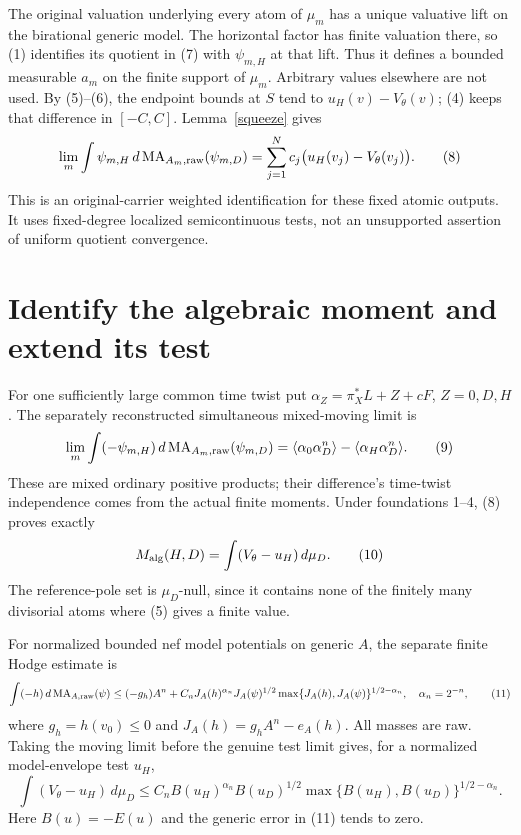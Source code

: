 \documentclass[10pt]{article}
\newcommand{\MA}{\operatorname{MA}}
\begin{document}
The original valuation underlying every atom of $\mu_m$ has a unique
valuative lift on the birational generic model. The horizontal factor
has finite valuation there, so (1) identifies its quotient in (7) with
$\psi_{m,H}$ at that lift. Thus it defines a bounded measurable $a_m$
on the finite support of $\mu_m$. Arbitrary values elsewhere are not
used. By (5)--(6), the endpoint bounds at $S$ tend to
$u_H(v)-V_\theta(v)$; (4) keeps that difference in $[-C,C]$.
Lemma~\ref{squeeze} gives
\[
 \lim_m\int\psi_{m,H}\,d\MA_{A_m,\rm raw}(\psi_{m,D})
       =\sum_{j=1}^N c_j\bigl(u_H(v_j)-V_\theta(v_j)\bigr).
 \tag{8}
\]
This is an original-carrier weighted identification for these fixed
atomic outputs. It uses fixed-degree localized semicontinuous tests,
not an unsupported assertion of uniform quotient convergence.

\section{Identify the algebraic moment and extend its test}
For one sufficiently large common time twist put
$\alpha_Z=\pi_X^*L+Z+cF$, $Z=0,D,H$. The separately reconstructed
simultaneous mixed-moving limit is
\[
 \lim_m\int(-\psi_{m,H})\,d\MA_{A_m,\rm raw}(\psi_{m,D})
  =\langle\alpha_0\alpha_D^n\rangle
                        -\langle\alpha_H\alpha_D^n\rangle.
 \tag{9}
\]
These are mixed ordinary positive products; their difference's time-twist
independence comes from the actual finite moments. Under foundations
1--4, (8) proves exactly
\[
 M_{\rm alg}(H,D)=\int(V_\theta-u_H)\,d\mu_D.
 \tag{10}
\]
The reference-pole set is $\mu_D$-null, since it contains none of the
finitely many divisorial atoms where (5) gives a finite value.

For normalized bounded nef model potentials on generic $A$, the
separate finite Hodge estimate is
\[
 \int(-h)\,d\MA_{A,\rm raw}(\psi)
 \le(-g_h)A^n+C_nJ_A(h)^{\alpha_n}J_A(\psi)^{1/2}
                  \max\{J_A(h),J_A(\psi)\}^{1/2-\alpha_n},
 \quad\alpha_n=2^{-n},
 \tag{11}
\]
where $g_h=h(v_0)\le0$ and $J_A(h)=g_hA^n-e_A(h)$.
All masses are raw. Taking the moving limit before the genuine test
limit gives, for a normalized model-envelope test $u_H$,
\[
 \int(V_\theta-u_H)\,d\mu_D
 \le C_n B(u_H)^{\alpha_n}B(u_D)^{1/2}
                   \max\{B(u_H),B(u_D)\}^{1/2-\alpha_n}.
 \tag{12}
\]
Here $B(u)=-E(u)$ and the generic error in (11) tends to zero.
\end{document}
